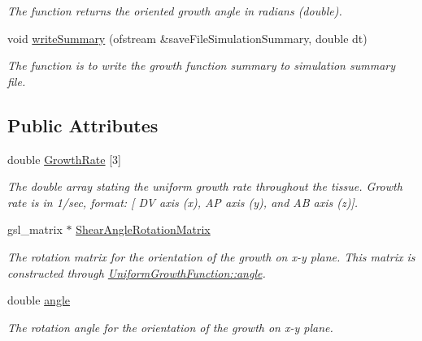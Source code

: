 \begin{DoxyCompactItemize}
\begin{DoxyCompactList}\small\item\em The function returns the oriented growth angle in radians (double). \end{DoxyCompactList}\item 
void \hyperlink{classUniformGrowthFunction_a227ffb3a524779628f98f110d3811399}{write\+Summary} (ofstream \&save\+File\+Simulation\+Summary, double dt)
\begin{DoxyCompactList}\small\item\em The function is to write the growth function summary to simulation summary file. \end{DoxyCompactList}\end{DoxyCompactItemize}
\subsection*{Public Attributes}
\begin{DoxyCompactItemize}
\item 
\hypertarget{classUniformGrowthFunction_af78591902b0cc391a62f3093fd14ad10}{}double \hyperlink{classUniformGrowthFunction_af78591902b0cc391a62f3093fd14ad10}{Growth\+Rate} \mbox{[}3\mbox{]}\label{classUniformGrowthFunction_af78591902b0cc391a62f3093fd14ad10}

\begin{DoxyCompactList}\small\item\em The double array stating the uniform growth rate throughout the tissue. Growth rate is in 1/sec, format\+: \mbox{[} D\+V axis (x), A\+P axis (y), and A\+B axis (z)\mbox{]}. \end{DoxyCompactList}\item 
\hypertarget{classUniformGrowthFunction_afef9ac84dfe60bbf3d558fbb31946087}{}gsl\+\_\+matrix $\ast$ \hyperlink{classUniformGrowthFunction_afef9ac84dfe60bbf3d558fbb31946087}{Shear\+Angle\+Rotation\+Matrix}\label{classUniformGrowthFunction_afef9ac84dfe60bbf3d558fbb31946087}

\begin{DoxyCompactList}\small\item\em The rotation matrix for the orientation of the growth on x-\/y plane. This matrix is constructed through \hyperlink{classUniformGrowthFunction_a1a985ff52f9796688e00942b4d3349f8}{Uniform\+Growth\+Function\+::angle}. \end{DoxyCompactList}\item 
\hypertarget{classUniformGrowthFunction_a1a985ff52f9796688e00942b4d3349f8}{}double \hyperlink{classUniformGrowthFunction_a1a985ff52f9796688e00942b4d3349f8}{angle}\label{classUniformGrowthFunction_a1a985ff52f9796688e00942b4d3349f8}

\begin{DoxyCompactList}\small\item\em The rotation angle for the orientation of the growth on x-\/y plane. \end{DoxyCompactList}\end{DoxyCompactItemize}


